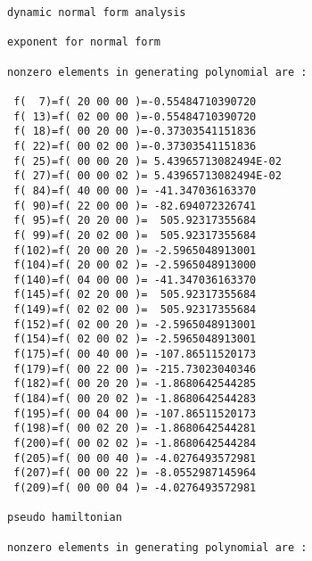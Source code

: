 \begin{footnotesize}
\begin{verbatim}
dynamic normal form analysis

exponent for normal form

nonzero elements in generating polynomial are :

 f(  7)=f( 20 00 00 )=-0.55484710390720
 f( 13)=f( 02 00 00 )=-0.55484710390720
 f( 18)=f( 00 20 00 )=-0.37303541151836
 f( 22)=f( 00 02 00 )=-0.37303541151836
 f( 25)=f( 00 00 20 )= 5.43965713082494E-02
 f( 27)=f( 00 00 02 )= 5.43965713082494E-02
 f( 84)=f( 40 00 00 )= -41.347036163370
 f( 90)=f( 22 00 00 )= -82.694072326741
 f( 95)=f( 20 20 00 )=  505.92317355684
 f( 99)=f( 20 02 00 )=  505.92317355684
 f(102)=f( 20 00 20 )= -2.5965048913001
 f(104)=f( 20 00 02 )= -2.5965048913000
 f(140)=f( 04 00 00 )= -41.347036163370
 f(145)=f( 02 20 00 )=  505.92317355684
 f(149)=f( 02 02 00 )=  505.92317355684
 f(152)=f( 02 00 20 )= -2.5965048913001
 f(154)=f( 02 00 02 )= -2.5965048913001
 f(175)=f( 00 40 00 )= -107.86511520173
 f(179)=f( 00 22 00 )= -215.73023040346
 f(182)=f( 00 20 20 )= -1.8680642544285
 f(184)=f( 00 20 02 )= -1.8680642544283
 f(195)=f( 00 04 00 )= -107.86511520173
 f(198)=f( 00 02 20 )= -1.8680642544281
 f(200)=f( 00 02 02 )= -1.8680642544284
 f(205)=f( 00 00 40 )= -4.0276493572981
 f(207)=f( 00 00 22 )= -8.0552987145964
 f(209)=f( 00 00 04 )= -4.0276493572981

pseudo hamiltonian

nonzero elements in generating polynomial are :


\end{verbatim}
\end{footnotesize}
